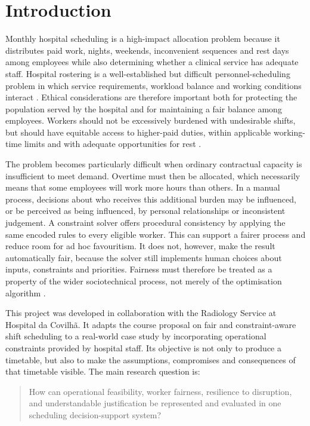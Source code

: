 \documentclass[11pt,a4paper]{article}
\begin{document}
\tableofcontents
\newpage

\section{Introduction}
Monthly hospital scheduling is a high-impact allocation problem because it distributes paid work, nights, weekends, inconvenient sequences and rest days among employees while also determining whether a clinical service has adequate staff. Hospital rostering is a well-established but difficult personnel-scheduling problem in which service requirements, workload balance and working conditions interact \cite{burke}. Ethical considerations are therefore important both for protecting the population served by the hospital and for maintaining a fair balance among employees. Workers should not be excessively burdened with undesirable shifts, but should have equitable access to higher-paid duties, within applicable working-time limits and with adequate opportunities for rest \cite{workingtime}.

The problem becomes particularly difficult when ordinary contractual capacity is insufficient to meet demand. Overtime must then be allocated, which necessarily means that some employees will work more hours than others. In a manual process, decisions about who receives this additional burden may be influenced, or be perceived as being influenced, by personal relationships or inconsistent judgement. A constraint solver offers procedural consistency by applying the same encoded rules to every eligible worker. This can support a fairer process and reduce room for ad hoc favouritism. It does not, however, make the result automatically fair, because the solver still implements human choices about inputs, constraints and priorities. Fairness must therefore be treated as a property of the wider sociotechnical process, not merely of the optimisation algorithm \cite{selbst}.

This project was developed in collaboration with the Radiology Service at Hospital da Covilhã. It adapts the course proposal on fair and constraint-aware shift scheduling to a real-world case study by incorporating operational constraints provided by hospital staff. Its objective is not only to produce a timetable, but also to make the assumptions, compromises and consequences of that timetable visible. The main research question is:

\begin{quote}
How can operational feasibility, worker fairness, resilience to disruption, and understandable justification be represented and evaluated in one scheduling decision-support system?
\end{quote}
\end{document}
